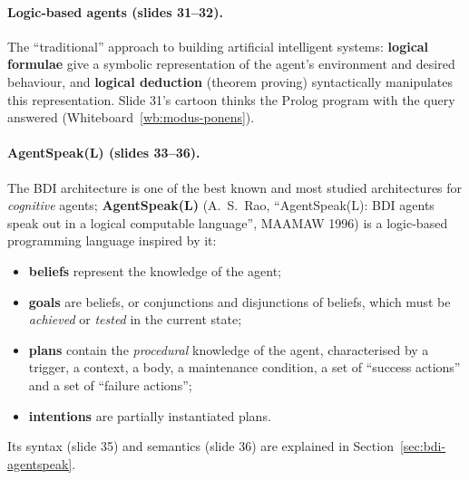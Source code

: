 \paragraph{Logic-based agents (slides 31--32).} The ``traditional'' approach to building
artificial intelligent systems: \textbf{logical formulae} give a symbolic representation of
the agent's environment and desired behaviour, and \textbf{logical deduction} (theorem
proving) syntactically manipulates this representation. Slide 31's cartoon thinks the Prolog
program   with the query
 answered  (Whiteboard~\ref{wb:modus-ponens}).

\paragraph{AgentSpeak(L) (slides 33--36).} The BDI architecture is one of the best known and
most studied architectures for \emph{cognitive} agents; \textbf{AgentSpeak(L)} (A.~S.~Rao,
``AgentSpeak(L): BDI agents speak out in a logical computable language'', MAAMAW 1996) is a
logic-based programming language inspired by it:
\begin{itemize}[nosep]
  \item \textbf{beliefs} represent the knowledge of the agent;
  \item \textbf{goals} are beliefs, or conjunctions and disjunctions of beliefs, which must
        be \emph{achieved} or \emph{tested} in the current state;
  \item \textbf{plans} contain the \emph{procedural} knowledge of the agent, characterised by
        a trigger, a context, a body, a maintenance condition, a set of ``success actions''
        and a set of ``failure actions'';
  \item \textbf{intentions} are partially instantiated plans.
\end{itemize}
Its syntax (slide 35) and semantics (slide 36) are explained in
Section~\ref{sec:bdi-agentspeak}.


